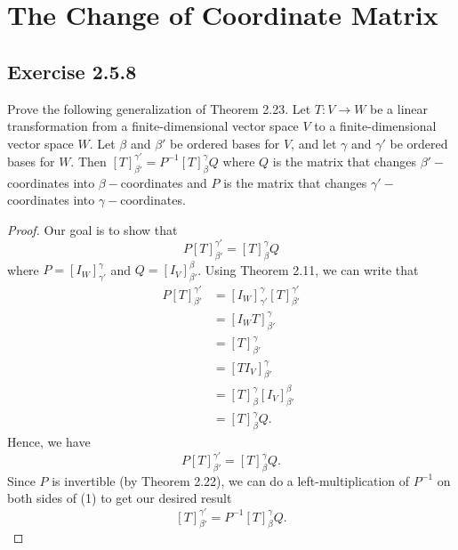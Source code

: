 \section{The Change of Coordinate Matrix}

\subsection*{Exercise 2.5.8} Prove the following generalization of Theorem 2.23. Let \( T : V \to W  \) be a linear transformation from a finite-dimensional vector space \( V  \) to a finite-dimensional vector space \( W  \). Let \( \beta  \) and \( \beta'  \) be ordered bases for \( V  \), and let \( \gamma  \) and \( \gamma'  \) be ordered bases for \( W  \). Then \(  [T]_{\beta'}^{\gamma'} = P^{-1} [T]_{\beta}^{\gamma} Q  \) where \( Q  \) is the matrix that changes \( \beta'- \)coordinates into \( \beta- \)coordinates and \( P  \) is the matrix that changes \( \gamma'-  \)coordinates into \( \gamma- \)coordinates. 
\begin{proof}
Our goal is to show that 
\[  P [T]_{\beta'}^{\gamma'} = [T]_{\beta}^{\gamma} Q \tag{1} \]
where \( P = [{I}_{W}]_{\gamma'}^{\gamma}  \) and \( Q = [{I}_{V}]_{\beta'}^{\beta}  \). Using Theorem 2.11, we can write that
\begin{align*}
    P [T]_{\beta'}^{\gamma'} &= [{I}_{W}]_{\gamma'}^{\gamma} [T]_{\beta'}^{\gamma'}  \\
                             &= [{I}_{W} T]_{\beta'}^{\gamma}  \\
                             &= [T]_{\beta'}^{\gamma}  \\
                             &= [T {I}_{V}]_{\beta'}^{\gamma}  \\
                             &= [T]_{\beta}^{\gamma} [{I}_{V}]_{\beta'}^{\beta} \\
                             &= [T]_{\beta}^{\gamma} Q.
\end{align*}
Hence, we have
\[  P [T]_{\beta'}^{\gamma'} = [T]_{\beta}^{\gamma} Q. \]
Since \( P  \) is invertible (by Theorem 2.22), we can do a left-multiplication of \( P^{-1} \) on both sides of (1) to get our desired result
\[  [T]_{\beta'}^{\gamma'} = P^{-1} [T]_{\beta}^{\gamma} Q. \]
\end{proof}

